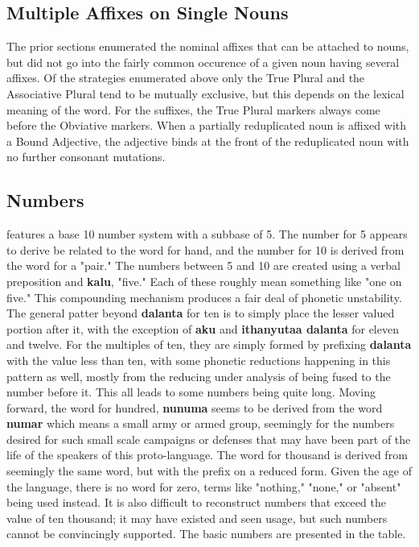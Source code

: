   \subsection{Multiple Affixes on Single Nouns}
  The prior sections enumerated the nominal affixes that can be attached to nouns, but did not go into the fairly common occurence of a given noun having several affixes. Of the strategies enumerated above only the True Plural and the Associative Plural tend to be mutually exclusive, but this depends on the lexical meaning of the word. For the suffixes, the True Plural markers always come before the Obviative markers. When a partially reduplicated noun is affixed with a Bound Adjective, the adjective binds at the front of the reduplicated noun with no further consonant mutations.
  \vertspace

  \subsection{Numbers}
  \langname features a base 10 number system with a subbase of 5. The number for 5 appears to derive be related to the word for hand, and the number for 10 is derived from the word for a "pair." The numbers between 5 and 10 are created using a verbal preposition and \textbf{kalu}, "five." Each of these roughly mean something like "one on five." This compounding mechanism produces a fair deal of phonetic unstability. The general patter beyond \textbf{dalanta} for ten is to simply place the lesser valued portion after it, with the exception of \textbf{aku\tenbase} and \textbf{ithanyutaa dalanta} for eleven and twelve. For the multiples of ten, they are simply formed by prefixing \textbf{dalanta} with the value less than ten, with some phonetic reductions happening in this pattern as well, mostly from the  reducing under analysis of being fused to the number before it. This all leads to some numbers being quite long. Moving forward, the word for hundred, \textbf{nunuma} seems to be derived from the word \textbf{numar} which means a small army or armed group, seemingly for the numbers desired for such small scale campaigns or defenses that may have been part of the life of the speakers of this proto-language. The word for thousand is derived from seemingly the same word, but with the \prefixtext{\boundbig} prefix on a reduced form. Given the age of the language, there is no word for zero, terms like "nothing," "none," or "absent" being used instead. It is also difficult to reconstruct numbers that exceed the value of ten thousand; it may have existed and seen usage, but such numbers cannot be convincingly supported. The basic numbers are presented in the table.
